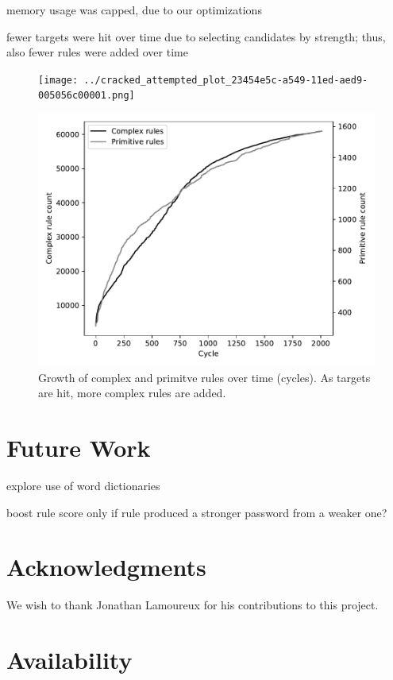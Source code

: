 \documentclass[letterpaper,twocolumn,10pt]{article}
\begin{document}
memory usage was capped, due to our optimizations

fewer targets were hit over time due to selecting candidates by strength; thus,
also fewer rules were added over time

\begin{figure}
\texttt{[image: ../cracked\_attempted\_plot\_23454e5c-a549-11ed-aed9-005056c00001.png]}
\end{figure}

\begin{figure}
\includegraphics[width=\linewidth]
{analysis/passwords-analysis/stats-rules_composites_size.pdf}
\caption{Growth of complex and primitve rules over time (cycles). As targets
are hit, more complex rules are added. }
\label{fig:rule_count}
\end{figure}

\section{Future Work}

explore use of word dictionaries

boost rule score only if rule produced a stronger password from a weaker one?

\section*{Acknowledgments}

We wish to thank Jonathan Lamoureux for his contributions to this project.

\section*{Availability}
\end{document}
